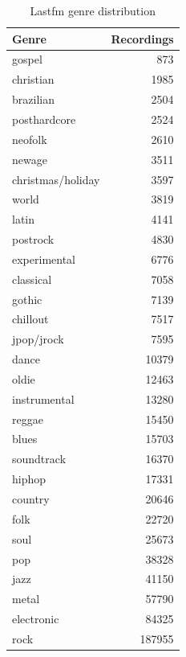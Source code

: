 \begin{table}[!htb]
    \centering
    \begin{tabular}{l r} 
        \hline
        Genre & Recordings \\ [0.5ex] 
        \hline
        gospel & 873  \\
        christian & 1985  \\
        brazilian & 2504  \\
        posthardcore & 2524  \\
        neofolk & 2610  \\
        newage & 3511  \\
        christmas/holiday & 3597  \\
        world & 3819  \\
        latin & 4141  \\
        postrock & 4830  \\
        experimental & 6776  \\
        classical & 7058  \\
        gothic & 7139  \\
        chillout & 7517  \\
        jpop/jrock & 7595  \\
        dance & 10379  \\
        oldie & 12463  \\
        instrumental & 13280  \\
        reggae & 15450  \\
        blues & 15703  \\
        soundtrack & 16370  \\
        hiphop & 17331  \\
        country & 20646  \\
        folk & 22720  \\
        soul & 25673  \\
        pop & 38328  \\
        jazz & 41150  \\
        metal & 57790  \\
        electronic & 84325  \\
        rock & 187955  \\
        \hline
    \end{tabular}
    \caption{Lastfm genre distribution}
    \label{table:lastfmdist}
\end{table}

